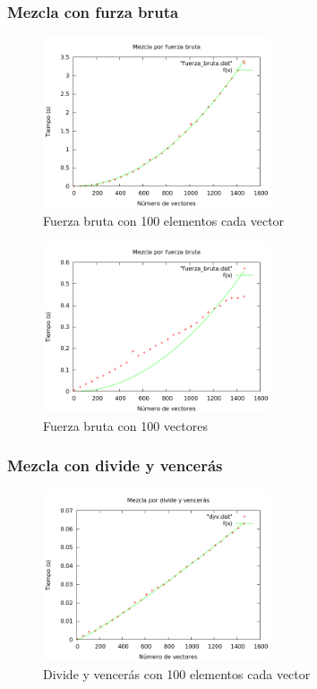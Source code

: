 \subsubsection{Mezcla con furza bruta}
\begin{figure}[htb] 
\centering
	\includegraphics[width=0.6\textwidth]{../Obligatorio/Graficas/fuerza_bruta_kvectores.png}
	\caption{Fuerza bruta con 100 elementos cada vector} 
	\label{fig:f_kvectores} 
\end{figure}

\begin{figure}[htb] 
\centering
	\includegraphics[width=0.6\textwidth]{../Obligatorio/Graficas/fuerza_bruta_nelementos.png}
	\caption{Fuerza bruta con 100 vectores} 
	\label{fig:f_nelementos} 
\end{figure}
\newpage


\subsubsection{Mezcla con divide y vencer\'as}
\begin{figure}[htb] 
\centering
	\includegraphics[width=0.6\textwidth]{../Obligatorio/Graficas/dyv_kvectores.png}
	\caption{Divide y vencerás con 100 elementos cada vector} 
	\label{fig:d_kvectores} 
\end{figure}

